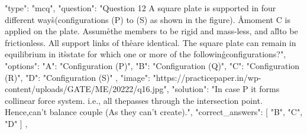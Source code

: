   {
    "type": "mcq",
    "question": "Question 12 A square plate is supported in four different ways\r\n(configurations (P) to (S) as shown in the figure). A\r\ncouple moment C is applied on the plate. Assume\r\nall the members to be rigid and mass-less, and all\r\njoints to be frictionless. All support links of the\r\nplate are identical. The square plate can remain in equilibrium in its\r\ninitial state for which one or more of the following\r\nsupport configurations?",
    "options": {
      "A": "Configuration (P)",
      "B": "Configuration (Q)",
      "C": "Configuration (R)",
      "D": "Configuration (S)"
    },
    "image": "https://practicepaper.in/wp-content/uploads/GATE/ME/20222/q16.jpg",
    "solution": "In case P it forms collinear force system. i.e., all the\nforce passes through the intersection point. Hence,\nthey can't balance couple (As they can't create\ncouple).",
    "correct_answers": [
      "B",
      "C",
      "D"
    ]
  },
